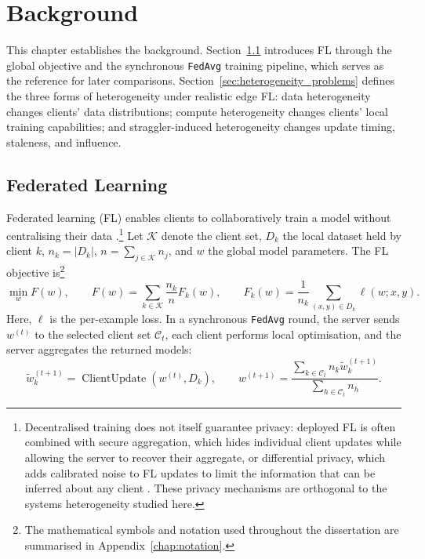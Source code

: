 \chapter{Background}
\label{chap:background}

This chapter establishes the background. Section~\ref{sec:problem_setting} introduces FL through the global objective and the synchronous \texttt{FedAvg} training pipeline, which serves as the reference for later comparisons. Section~\ref{sec:heterogeneity_problems} defines the three forms of heterogeneity under realistic edge FL: data heterogeneity changes clients' data distributions; compute heterogeneity changes clients' local training capabilities; and straggler-induced heterogeneity changes update timing, staleness, and influence.

\section{Federated Learning}
\label{sec:problem_setting}

Federated learning (FL) enables clients to collaboratively train a model without centralising their data \parencite{mcmahan2017fedavg,kairouz2021advances,bonawitz2019towards}.\footnote{Decentralised training does not itself guarantee privacy: deployed FL is often combined with secure aggregation, which hides individual client updates while allowing the server to recover their aggregate, or differential privacy, which adds calibrated noise to FL updates to limit the information that can be inferred about any client \parencite{bonawitz2017secureaggregation,dwork2006calibrating,abadi2016deep}. These privacy mechanisms are orthogonal to the systems heterogeneity studied here.} Let \(\mathcal{K}\) denote the client set, \(D_k\) the local dataset held by client \(k\), \(n_k=|D_k|\), \(n=\sum_{j\in\mathcal{K}}n_j\), and \(w\) the global model parameters. The FL objective is\footnote{The mathematical symbols and notation used throughout the dissertation are summarised in Appendix~\ref{chap:notation}.}
\[
    \min_w F(w),
    \qquad
    F(w) = \sum_{k \in \mathcal{K}} \frac{n_k}{n} F_k(w),
    \qquad
    F_k(w) = \frac{1}{n_k}\sum_{(x,y)\in D_k} \ell(w;x,y).
\]
Here, \(\ell\) is the per-example loss.
In a synchronous \texttt{FedAvg} round, the server sends \(w^{(t)}\) to the selected client set \(\mathcal{C}_t\), each client performs local optimisation, and the server aggregates the returned models:
\[
    \tilde{w}_k^{(t+1)}
    =
    \operatorname{ClientUpdate}(w^{(t)}, D_k),
    \qquad
    w^{(t+1)}
    =
    \frac{\sum_{k\in\mathcal{C}_t} n_k \tilde{w}_k^{(t+1)}}
         {\sum_{h\in\mathcal{C}_t} n_h}.
\]

